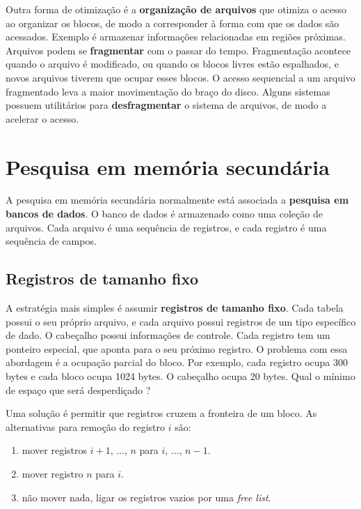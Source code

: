 Outra forma de otimização é a \textbf{organização de arquivos} que otimiza o acesso ao
organizar os blocos, de modo a corresponder à forma com que os dados são acessados.
Exemplo é armazenar informações relacionadas em regiões próximas.
Arquivos podem se \textbf{fragmentar} com o passar do tempo.
Fragmentação acontece quando o arquivo é modificado, ou quando os blocos livres
estão espalhados, e novos arquivos tiverem que ocupar esses blocos.
O acesso sequencial a um arquivo fragmentado leva a maior movimentação do
braço do disco. 
Alguns sistemas possuem utilitários para \textbf{desfragmentar} o sistema
de arquivos, de modo a acelerar o acesso.

\section{Pesquisa em memória secundária}

A pesquisa em memória secundária normalmente está associada a \textbf{pesquisa 
em bancos de dados}.
O banco de dados é armazenado como uma coleção de arquivos. Cada arquivo
é uma sequência de registros, e cada registro é uma sequência de campos.

\subsection{Registros de tamanho fixo}

A estratégia mais simples é assumir \textbf{registros de tamanho fixo}.
Cada tabela possui o seu próprio arquivo, e cada arquivo possui registros
de um tipo específico de dado.
O cabeçalho possui informações de controle. Cada registro tem um ponteiro
especial, que aponta para o seu próximo registro.
O problema com essa abordagem é a ocupação parcial do bloco.
Por exemplo, cada registro ocupa 300 bytes e cada bloco ocupa 1024 bytes.
O cabeçalho ocupa 20 bytes. Qual o mínimo de espaço que será desperdiçado ?

Uma solução é permitir que registros cruzem a fronteira de um bloco. 
As alternativas para remoção do registro $i$ são:
\begin{enumerate}
\item mover registros $i+1$, ..., $n$ para $i$, ..., $n-1$.
\item mover registro $n$ para $i$.
\item não mover nada, ligar os registros vazios por uma \emph{free list}.
\end{enumerate}

